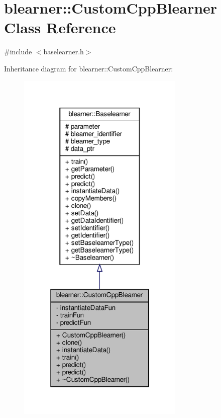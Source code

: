 \hypertarget{classblearner_1_1_custom_cpp_blearner}{}\section{blearner\+:\+:Custom\+Cpp\+Blearner Class Reference}
\label{classblearner_1_1_custom_cpp_blearner}


{\ttfamily \#include $<$baselearner.\+h$>$}



Inheritance diagram for blearner\+:\+:Custom\+Cpp\+Blearner\+:
\nopagebreak
\begin{figure}[H]
\begin{center}
\leavevmode
\includegraphics[width=226pt]{classblearner_1_1_custom_cpp_blearner__inherit__graph}
\end{center}
\end{figure}


